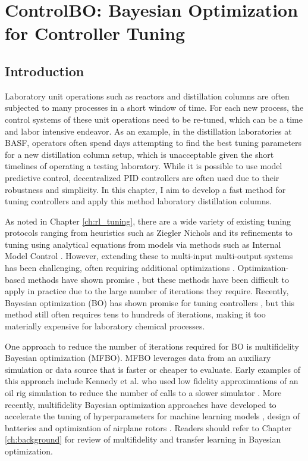 \chapter{ControlBO: Bayesian Optimization for Controller Tuning}\label{ch:mfbo} 

\section{Introduction}
\label{sec:intro}
Laboratory unit operations such as reactors and distillation columns  are often subjected to many processes in a short window of time. For each new process, the control systems of these unit operations need to be re-tuned, which can be a time and labor intensive endeavor. As an example, in the distillation laboratories at BASF, operators often spend days attempting to find the best tuning parameters for a new distillation column setup, which is unacceptable given the short timelines of operating a testing laboratory. While it is possible to use model predictive control, decentralized PID controllers are often used due to their robustness and simplicity. In this chapter, I aim to develop a fast method for tuning controllers and apply this method laboratory distillation columns.

As noted in Chapter \ref{ch:rl_tuning}, there are a wide variety of existing tuning protocols ranging from heuristics such as Ziegler Nichols \cite{Ziegler1942} and its refinements \cite{Hang1991} to tuning using analytical equations from models via methods such as  Internal Model Control \cite{Copeland2010}. However, extending these to multi-input multi-output systems has been challenging, often requiring additional optimizations \cite{Nandong2013, Nandong2015}. Optimization-based methods have shown promise \cite{Pajares2019, Sumana2010, Rajapandiyan2012, Behroozsarand2012}, but these methods have been difficult to apply in practice due to the large number of iterations they require. Recently, Bayesian optimization (BO) has shown promise for tuning controllers \cite{NeumannBrosig2020, Fiducioso2019, Khosravi2020, Konig2020, Fujimoto2022, Brunzema2022, Khosravi2022}, but this method still often requires tens to hundreds of iterations, making it too materially expensive for laboratory chemical processes.

One approach to reduce the number of iterations required for BO is multifidelity Bayesian optimization (MFBO). MFBO leverages data from an auxiliary simulation or data source that is faster or cheaper to evaluate. Early examples of this approach include Kennedy et al. who used low fidelity approximations of an oil rig simulation to reduce the number of calls to a slower simulator \cite{Kennedy2000}. More recently, multifidelity Bayesian optimization approaches have developed to accelerate the tuning of hyperparameters for machine learning models \cite{pmlr-v70-kandasamy17a}, design of batteries \cite{Folch2023} and optimization of airplane rotors \cite{Pan2017}. Readers should refer to Chapter \ref{ch:background} for review of multifidelity and transfer learning in Bayesian optimization.

